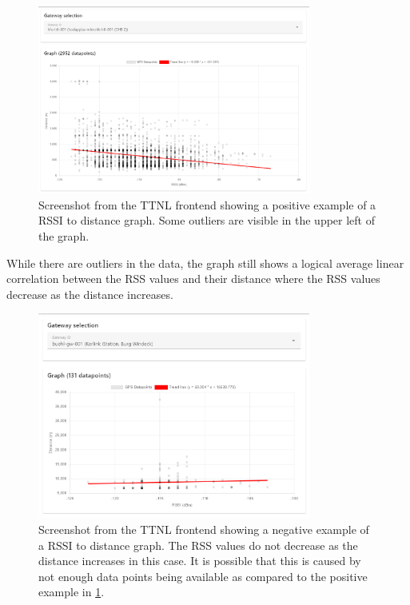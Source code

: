 \begin{figure}[htbp]
    \centering
    \includegraphics[width=0.8\textwidth]{pictures/ttn-locator/frontend/data/gateway_ghb_rssi_range_graph.png}
    \caption{
        Screenshot from the \ac{TTNL} frontend showing a positive example of a \ac{RSSI} to distance graph.
        Some outliers are visible in the upper left of the graph.
    }\label{fig:rssi-range-graph-positive-example}
\end{figure}

While there are outliers in the data, the graph still shows a logical average linear correlation between the \ac{RSS} values and their distance where the \ac{RSS} values decrease as the distance increases.

\begin{figure}[htbp]
    \centering
    \includegraphics[width=0.8\textwidth]{pictures/ttn-locator/frontend/data/gateway_buehl_gw_rssi_range_graph.png}
    \caption{
        Screenshot from the \ac{TTNL} frontend showing a negative example of a \ac{RSSI} to distance graph.
        The \ac{RSS} values do not decrease as the distance increases in this case.
        It is possible that this is caused by not enough data points being available as compared to the positive example in \cref{fig:rssi-range-graph-positive-example}.
    }\label{fig:rssi-range-graph-negative-example}
\end{figure}

